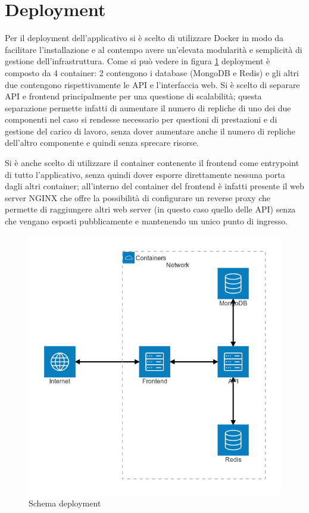 \section{Deployment}

Per il deployment dell'applicativo si è scelto di utilizzare Docker in modo da facilitare l'installazione e al contempo avere un'elevata modularità e semplicità di gestione dell'infrastruttura.
Come si può vedere in figura \ref{fig:deployment_schema} deployment è composto da 4 container: 2 contengono i database (MongoDB e Redis) e gli altri due contengono rispettivamente le API e l'interfaccia web.
Si è scelto di separare API e frontend principalmente per una questione di scalabilità; questa separazione permette infatti di aumentare il numero di repliche di uno dei due componenti nel caso si rendesse necessario per questioni di prestazioni e di gestione del carico di lavoro, senza dover aumentare anche il numero di repliche dell'altro componente e quindi senza sprecare risorse.

Si è anche scelto di utilizzare il container contenente il frontend come entrypoint di tutto l'applicativo, senza quindi dover esporre direttamente nessuna porta dagli altri container; all'interno del container del frontend è infatti presente il web server NGINX che offre la possibilità di configurare un reverse proxy che permette di raggiungere altri web server (in questo caso quello delle API) senza che vengano esposti pubblicamente e mantenendo un unico punto di ingresso.

\begin{figure}
    \centering
    \includegraphics[width=0.9\linewidth]{images/deployment_diagram.png}
    \caption{Schema deployment}
    \label{fig:deployment_schema}
\end{figure}

